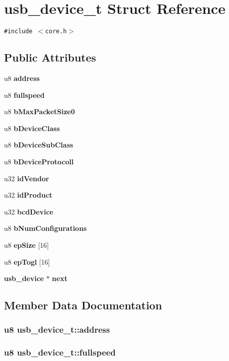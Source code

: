\section{usb\_\-device\_\-t Struct Reference}
\label{structusb__device__t}
{\tt \#include $<$core.h$>$}

\subsection*{Public Attributes}
\begin{CompactItemize}
\item 
u8 {\bf address}
\item 
u8 {\bf fullspeed}
\item 
u8 {\bf b\-Max\-Packet\-Size0}
\item 
u8 {\bf b\-Device\-Class}
\item 
u8 {\bf b\-Device\-Sub\-Class}
\item 
u8 {\bf b\-Device\-Protocoll}
\item 
u32 {\bf id\-Vendor}
\item 
u32 {\bf id\-Product}
\item 
u32 {\bf bcd\-Device}
\item 
u8 {\bf b\-Num\-Configurations}
\item 
u8 {\bf ep\-Size} [16]
\item 
u8 {\bf ep\-Togl} [16]
\item 
{\bf usb\_\-device} $\ast$ {\bf next}
\end{CompactItemize}


\subsection{Member Data Documentation}
\subsubsection{\setlength{\rightskip}{0pt plus 5cm}u8 {\bf usb\_\-device\_\-t::address}}\label{structusb__device__t_10a322dde178d9d34dd9d922f4272fbd}


\subsubsection{\setlength{\rightskip}{0pt plus 5cm}u8 {\bf usb\_\-device\_\-t::fullspeed}}\label{structusb__device__t_fe86508f8b9904b1d0230434281626ab}


